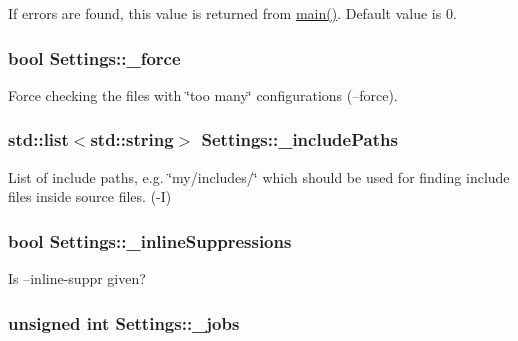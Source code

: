 If errors are found, this value is returned from \hyperlink{cli_2main_8cpp_a0ddf1224851353fc92bfbff6f499fa97}{main()}. Default value is 0. 

\hypertarget{class_settings_a308bf6973159f94f1889c1008fe08b5d}{
\subsubsection[{\-\_\-force}]{\setlength{\rightskip}{0pt plus 5cm}bool Settings\-::\-\_\-force}}\label{class_settings_a308bf6973159f94f1889c1008fe08b5d}


Force checking the files with \char`\"{}too many\char`\"{} configurations (--force). 

\hypertarget{class_settings_ad9a5e9c7ab0ad1ea6b6d87fe1486b69d}{
\subsubsection[{\-\_\-include\-Paths}]{\setlength{\rightskip}{0pt plus 5cm}std\-::list$<$std\-::string$>$ Settings\-::\-\_\-include\-Paths}}\label{class_settings_ad9a5e9c7ab0ad1ea6b6d87fe1486b69d}


List of include paths, e.\-g. \char`\"{}my/includes/\char`\"{} which should be used for finding include files inside source files. (-\/\-I) 

\hypertarget{class_settings_ad51ddd067998b229c64589f183952392}{
\subsubsection[{\-\_\-inline\-Suppressions}]{\setlength{\rightskip}{0pt plus 5cm}bool Settings\-::\-\_\-inline\-Suppressions}}\label{class_settings_ad51ddd067998b229c64589f183952392}


Is --inline-\/suppr given? 

\hypertarget{class_settings_ad1d32f22bf496ef134ce83512b3179a6}{
\subsubsection[{\-\_\-jobs}]{\setlength{\rightskip}{0pt plus 5cm}unsigned int Settings\-::\-\_\-jobs}}\label{class_settings_ad1d32f22bf496ef134ce83512b3179a6}


